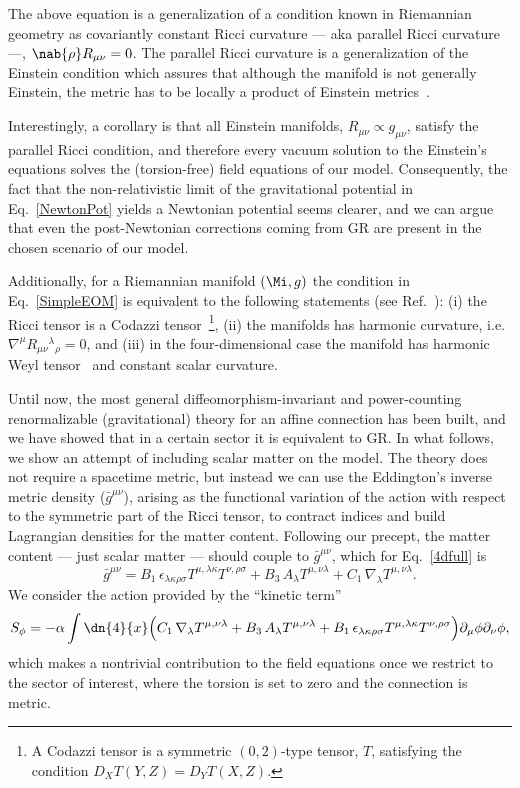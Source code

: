 \documentclass[aps,prl,twocolumn,superscriptaddress,showpacs,showkeys]{revtex4-1}
\begin{document}
The above equation is a generalization of a condition known in Riemannian geometry as covariantly constant Ricci curvature --- aka parallel Ricci curvature ---, \mbox{$\nab{\rho} R_{\mu\nu} = 0$.} The parallel Ricci curvature is a generalization of the Einstein condition which assures that although the manifold is not generally Einstein, the metric has to be locally a product of Einstein metrics~\cite{Besse}.

Interestingly, a corollary is that all Einstein manifolds, \mbox{$R_{\mu\nu} \propto g_{\mu\nu}$,} satisfy the parallel Ricci condition, and therefore every vacuum solution to the Einstein's equations solves the (torsion-free) field equations of our model. Consequently, the fact that the non-relativistic limit of the gravitational potential in Eq.~\eqref{NewtonPot} yields a Newtonian potential seems clearer, and we can argue that even the post-Newtonian corrections coming from GR are present in the chosen scenario of our model.

Additionally, for a Riemannian manifold $(\Mi,g)$ the condition in Eq.~\eqref{SimpleEOM} is equivalent to the following statements (see Ref.~\cite{Derdzinski:1985,Besse}): (i) the Ricci tensor is a Codazzi tensor~\footnote{A Codazzi tensor is a symmetric $(0,2)$-type tensor, $T$, satisfying the condition \mbox{$D_X T(Y,Z) = D_Y T(X,Z)$.}}, (ii) the manifolds has harmonic curvature, i.e. \mbox{$\nabla^\mu R_{\mu\nu}{}^\lambda{}_\rho = 0$,} and (iii) in the four-dimensional case the manifold has harmonic Weyl tensor~\cite{Berger:1969} and constant scalar curvature.

Until now, the most general diffeomorphism-invariant and power-counting renormalizable (gravitational) theory for an affine connection has been built, and we have showed that in a certain sector it is equivalent to GR. In what follows, we show an attempt of including scalar matter on the model. The theory does not require a spacetime metric, but instead we can use the Eddington's inverse metric density ($\bar{g}^{\mu\nu}$), arising as the functional variation of the action with respect to the symmetric part of the Ricci tensor, to contract indices and build Lagrangian densities for the matter content. Following our precept, the matter content --- just scalar matter --- should couple to $\bar{g}^{\mu\nu}$, which for Eq.~\eqref{4dfull} is
\begin{dmath}
  \bar{g}^{\mu\nu} = B_1\, \epsilon_{\lambda\kappa\rho\sigma} T^{\mu, \lambda\kappa} T^{\nu, \rho\sigma} + B_3\, A_\lambda T^{\mu,\nu\lambda} + C_1\, \nabla_\lambda T^{\mu,\nu\lambda}.
\end{dmath}
We consider the action provided by the ``kinetic term''
\begin{dmath}
  \label{ScalarAction}
  S_\phi = - \alpha \int \dn{4}{x} \Big( C_1\, \nabla_\lambda T^{\mu,\nu\lambda}  + B_3\, A_\lambda T^{\mu,\nu\lambda} + B_1\, \epsilon_{\lambda\kappa\rho\sigma} T^{\mu, \lambda\kappa} T^{\nu, \rho\sigma} \Big) \partial_\mu\phi\partial_\nu\phi,
\end{dmath}
which makes a nontrivial contribution to the field equations once we restrict to the sector of interest, where the torsion is set to zero and the connection is metric.
\end{document}
